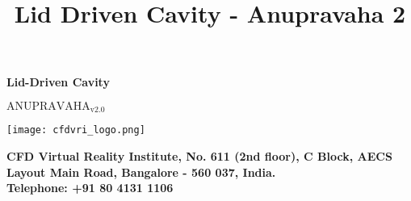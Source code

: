 \documentclass[a4paper]{report}
\title{\textbf{\Huge Lid Driven Cavity - Anupravaha 2}}
\date{}
\begin{document}
   \begin{titlepage}   	   
        
       \vspace*{3.5cm}
       \hspace*{3.5cm}\textbf{\Huge Lid-Driven Cavity} 
       
        \vspace*{0.5cm}
         \hspace*{9cm} \textbf{\large $\text{ANUPRAVAHA}_{\text{v2.0}}$}
                         
          \vfill

\begin{minipage}{0.5\textwidth}
		\texttt{[image: cfdvri\_logo.png]}
\end{minipage}

         
          \vspace*{1cm}
        
        
        \vspace*{0.2cm}
        
        \textbullet \textbf{\hspace*{0.3cm}CFD Virtual Reality Institute, No. 611 (2nd floor), C Block, AECS Layout Main   \hspace*{1cm}Road, Bangalore - 560 037,  India. \\ \hspace*{0.9cm} Telephone: +91 80 4131 1106}
           
    \end{titlepage}

\makeatletter

 
\newpage
\tableofcontents
\listoffigures
\listoftables 

\newpage


%  

\renewcommand{\bibname}{References}
%

\nocite{*}

\end{document}
